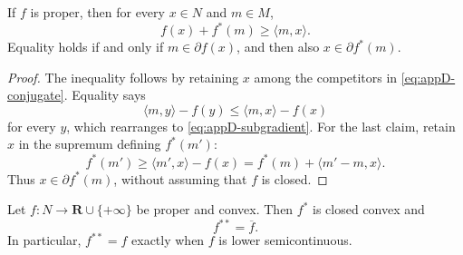 \begin{proposition}\label{prop:appD-fenchel-equality}
If \(f\) is proper, then for every \(x\in N\) and \(m\in M\),
\[
                       f(x)+f^*(m)\geq\langle m,x\rangle.
\tag{D.4}\label{eq:appD-fenchel}
\]
Equality holds if and only if
\(m\in\partial f(x)\), and then also \(x\in\partial f^*(m)\).
\end{proposition}

\begin{proof}
The inequality follows by retaining \(x\) among the competitors in
\eqref{eq:appD-conjugate}.
Equality says
\[
 \langle m,y\rangle-f(y)
 \leq \langle m,x\rangle-f(x)
\]
for every \(y\), which rearranges to \eqref{eq:appD-subgradient}.
For the last claim, retain \(x\) in the supremum defining \(f^*(m')\):
\[
 f^*(m')\geq\langle m',x\rangle-f(x)
 =f^*(m)+\langle m'-m,x\rangle.
\]
Thus \(x\in\partial f^*(m)\), without assuming that \(f\) is closed.
\end{proof}

\begin{theorem}\label{thm:appD-fenchel-moreau}
Let \(f:N\to\mathbf R\cup\{+\infty\}\) be proper and convex.
Then \(f^*\) is closed convex and
\[
                          f^{**}=\overline f.
\tag{D.5}\label{eq:appD-biconjugate}
\]
In particular, \(f^{**}=f\) exactly when \(f\) is lower semicontinuous.
\end{theorem}

